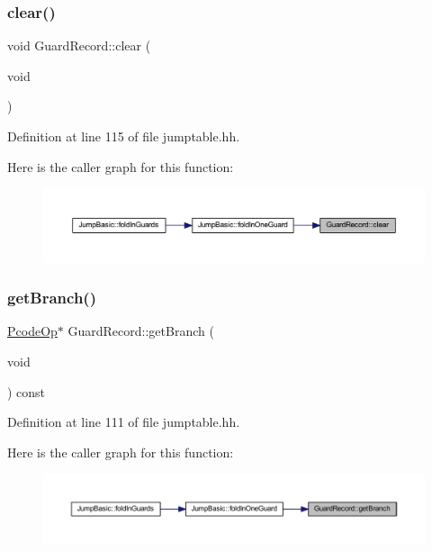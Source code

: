 \subsubsection{\texorpdfstring{clear()}{clear()}}
{\footnotesize\ttfamily void Guard\+Record\+::clear (\begin{DoxyParamCaption}\item[{void}]{ }\end{DoxyParamCaption})\hspace{0.3cm}{\ttfamily [inline]}}



Definition at line 115 of file jumptable.\+hh.

Here is the caller graph for this function\+:
\nopagebreak
\begin{figure}[H]
\begin{center}
\leavevmode
\includegraphics[width=350pt]{class_guard_record_a0a8baf99a2c1c3119a5d1c43426e6308_icgraph}
\end{center}
\end{figure}
\mbox{\label{class_guard_record_a2c1c2df275015bd4226e174113bf139c}} 
\subsubsection{\texorpdfstring{getBranch()}{getBranch()}}
{\footnotesize\ttfamily \mbox{\hyperlink{class_pcode_op}{Pcode\+Op}}$\ast$ Guard\+Record\+::get\+Branch (\begin{DoxyParamCaption}\item[{void}]{ }\end{DoxyParamCaption}) const\hspace{0.3cm}{\ttfamily [inline]}}



Definition at line 111 of file jumptable.\+hh.

Here is the caller graph for this function\+:
\nopagebreak
\begin{figure}[H]
\begin{center}
\leavevmode
\includegraphics[width=350pt]{class_guard_record_a2c1c2df275015bd4226e174113bf139c_icgraph}
\end{center}
\end{figure}
\mbox{\label{class_guard_record_a533e9b8023e2b1887475227690c23034}} 
